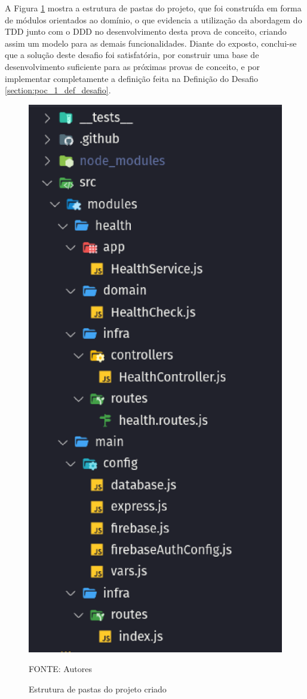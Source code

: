A Figura \ref{fig-poc1-pastas} mostra a estrutura de pastas do projeto, que foi construída em forma de módulos orientados ao domínio,
o que evidencia a utilização da abordagem do 
TDD junto com o DDD no desenvolvimento desta prova de conceito, criando assim um modelo para as demais 
funcionalidades. Diante do exposto, conclui-se que a solução deste desafio foi satisfatória, por 
construir uma base de desenvolvimento suficiente para as próximas provas de conceito, e por implementar 
completamente a definição feita na Definição do Desafio \ref{section:poc_1_def_desafio}.

\begin{figure}[h]
	\centering
  \caption{Estrutura de pastas do projeto criado}
	\includegraphics[keepaspectratio=true,scale=0.6]{figuras/poc1-pastas.eps}
	\parbox{\linewidth}{\centering FONTE: Autores}
	\label{fig-poc1-pastas}
\end{figure}

